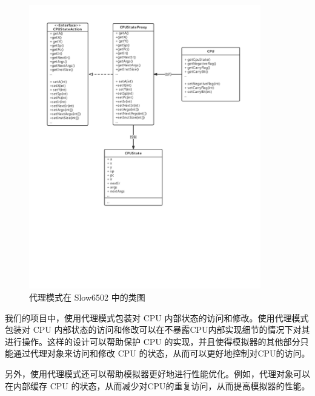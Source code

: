 \begin{figure}[htb]
  \centering
  \includegraphics[width=0.9\textwidth]{figures/Proxy.pdf}
  \caption{代理模式在 Slow6502 中的类图}
\end{figure}

我们的项目中，使用代理模式包装对 CPU 内部状态的访问和修改。使用代理模式包装对 CPU 内部状态的访问和修改可以在不暴露CPU内部实现细节的情况下对其进行操作。这样的设计可以帮助保护 CPU 的实现，并且使得模拟器的其他部分只能通过代理对象来访问和修改 CPU 的状态，从而可以更好地控制对CPU的访问。

另外，使用代理模式还可以帮助模拟器更好地进行性能优化。例如，代理对象可以在内部缓存 CPU 的状态，从而减少对CPU的重复访问，从而提高模拟器的性能。
